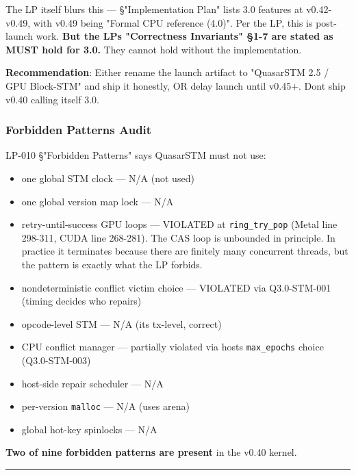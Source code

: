 \documentclass[
]{article}
\providecommand{\tightlist}{%
  \setlength{\itemsep}{0pt}\setlength{\parskip}{0pt}}
\begin{document}
The LP itself blurs this --- §"Implementation Plan" lists 3.0 features
at v0.42-v0.49, with v0.49 being "Formal CPU reference (4.0)". Per the
LP, this is post-launch work. \textbf{But the LP\textquotesingle s
"Correctness Invariants" §1-7 are stated as MUST hold for 3.0.} They
cannot hold without the implementation.

\textbf{Recommendation}: Either rename the launch artifact to "QuasarSTM
2.5 / GPU Block-STM" and ship it honestly, OR delay launch until v0.45+.
Don\textquotesingle t ship v0.40 calling itself 3.0.

\subsubsection{Forbidden Patterns Audit}\label{forbidden-patterns-audit}

LP-010 §"Forbidden Patterns" says QuasarSTM must not use:

\begin{itemize}
\tightlist
\item
  one global STM clock --- N/A (not used)
\item
  one global version map lock --- N/A
\item
  retry-until-success GPU loops --- VIOLATED at \texttt{ring\_try\_pop}
  (Metal line 298-311, CUDA line 268-281). The CAS loop is unbounded in
  principle. In practice it terminates because there are finitely many
  concurrent threads, but the pattern is exactly what the LP forbids.
\item
  nondeterministic conflict victim choice --- VIOLATED via Q3.0-STM-001
  (timing decides who repairs)
\item
  opcode-level STM --- N/A (it\textquotesingle s tx-level, correct)
\item
  CPU conflict manager --- partially violated via host\textquotesingle s
  \texttt{max\_epochs} choice (Q3.0-STM-003)
\item
  host-side repair scheduler --- N/A
\item
  per-version \texttt{malloc} --- N/A (uses arena)
\item
  global hot-key spinlocks --- N/A
\end{itemize}

\textbf{Two of nine forbidden patterns are present} in the v0.40 kernel.

\begin{center}\rule{0.5\linewidth}{0.5pt}\end{center}
\end{document}
